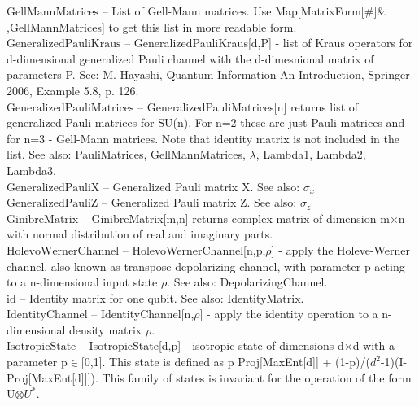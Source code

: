 \documentclass[a4paper,10pt]{scrartcl}
\begin{document}
\textbf{$ \text{GellMannMatrices} $ }-- List of Gell-Mann matrices. Use Map[MatrixForm[$\#$]$\&$,GellMannMatrices] to get this list in more readable form.$  $\\

\textbf{$ \text{GeneralizedPauliKraus} $ }-- GeneralizedPauliKraus[d,P] - list of Kraus operators for d-dimensional generalized Pauli channel with the d-dimesnional matrix of parameters P. See: M. Hayashi, Quantum Information An Introduction, Springer 2006, Example 5.8, p. 126.$  $\\

\textbf{$ \text{GeneralizedPauliMatrices} $ }-- GeneralizedPauliMatrices[n] returns list of generalized Pauli matrices for SU(n). For n=2 these are just Pauli matrices and for n=3 - Gell-Mann matrices. Note that identity matrix is not included in the list. See also: PauliMatrices, GellMannMatrices, $\lambda $, Lambda1, Lambda2, Lambda3.$  $\\

\textbf{$ \text{GeneralizedPauliX} $ }-- Generalized Pauli matrix X. See also: $ \sigma _x $\\

\textbf{$ \text{GeneralizedPauliZ} $ }-- Generalized Pauli matrix Z. See also: $ \sigma _z $\\

\textbf{$ \text{GinibreMatrix} $ }-- GinibreMatrix[m,n] returns complex matrix of dimension m$\times $n with normal distribution of real and imaginary parts.$  $\\

\textbf{$ \text{HolevoWernerChannel} $ }-- HolevoWernerChannel[n,p,$\rho $] - apply the Holeve-Werner channel, also known as transpose-depolarizing channel, with parameter p acting to a n-dimensional input state $\rho $. See also: DepolarizingChannel.$  $\\

\textbf{$ \text{id} $ }-- Identity matrix for one qubit. See also: IdentityMatrix.$  $\\

\textbf{$ \text{IdentityChannel} $ }-- IdentityChannel[n,$\rho $] - apply the identity operation to a n-dimensional density matrix $\rho $.$  $\\

\textbf{$ \text{IsotropicState} $ }-- IsotropicState[d,p] - isotropic state of dimensions d$\times $d with a parameter p$\in $[0,1]. This state is defined as p Proj[MaxEnt[d]] + (1-p)/($ d^2 $-1)(I-Proj[MaxEnt[d]]]). This family of states is invariant for the operation of the form U$\otimes $$ U^*. $\\
\end{document}
